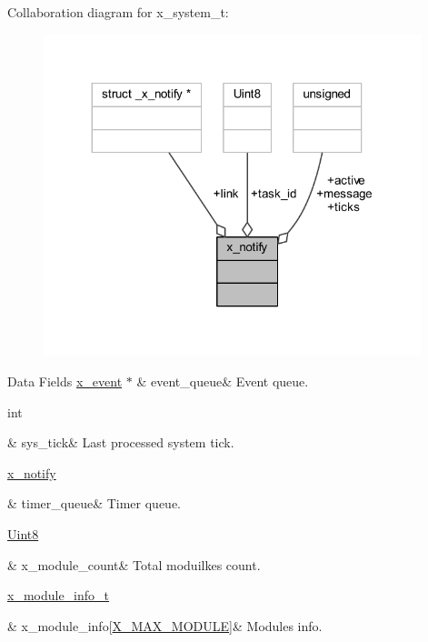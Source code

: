 Collaboration diagram for x\+\_\+system\+\_\+t\+:\nopagebreak
\begin{figure}[H]
\begin{center}
\leavevmode
\includegraphics[width=311pt]{df/d12/a01703}
\end{center}
\end{figure}
\begin{DoxyFields}{Data Fields}
\hypertarget{a00037_aae3e0af6b968bca8cea3ebff4b8918cb}{\hyperlink{a00036_de/d37/a00849}{x\+\_\+event} $\ast$}\label{a00037_aae3e0af6b968bca8cea3ebff4b8918cb}
&
event\+\_\+queue&
Event queue. \\
\hline

\hypertarget{a00037_aab260797348ca628ed4820714e229a74}{int}\label{a00037_aab260797348ca628ed4820714e229a74}
&
sys\+\_\+tick&
Last processed system tick. \\
\hline

\hypertarget{a00037_a10669284e4e6a0d578a68a0b5fbe0d5b}{\hyperlink{a00036_df/d4c/a00851}{x\+\_\+notify}}\label{a00037_a10669284e4e6a0d578a68a0b5fbe0d5b}
&
timer\+\_\+queue&
Timer queue. \\
\hline

\hypertarget{a00037_a80c19e87a59b3ee9def711195641cd26}{\hyperlink{a00072_af84840501dec18061d18a68c162a8fa2}{Uint8}}\label{a00037_a80c19e87a59b3ee9def711195641cd26}
&
x\+\_\+module\+\_\+count&
Total moduilkes count. \\
\hline

\hypertarget{a00037_a6724d1e1430a0e89c134b30152988385}{\hyperlink{a00037_dc/d0a/a00850}{x\+\_\+module\+\_\+info\+\_\+t}}\label{a00037_a6724d1e1430a0e89c134b30152988385}
&
x\+\_\+module\+\_\+info\mbox{[}\hyperlink{a00037_a04282f21b2fb8a316c5d04a2dfd24eaa}{X\+\_\+\+M\+A\+X\+\_\+\+M\+O\+D\+U\+L\+E}\mbox{]}&
Modules info. \\
\hline

\end{DoxyFields}
\label{dd/de1/a00871}
\hypertarget{a00037_dd/de1/a00871}{}
